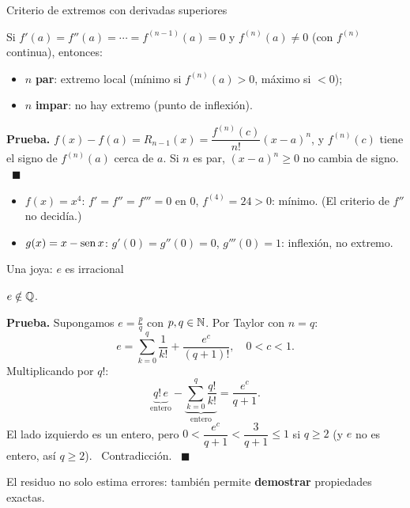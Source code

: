 \documentclass[10pt,aspectratio=169]{beamer}
\begin{document}
\begin{frame}{Criterio de extremos con derivadas superiores}
  \begin{teorema}
    Si $f'(a)=f''(a)=\cdots=f^{(n-1)}(a)=0$ y $f^{(n)}(a)\neq0$ (con $f^{(n)}$ continua), entonces:
    \begin{itemize}
      \item $n$ \textbf{par}: extremo local (mínimo si $f^{(n)}(a)>0$, máximo si $<0$);
      \item $n$ \textbf{impar}: no hay extremo (punto de inflexión).
    \end{itemize}
  \end{teorema}
  \textbf{Prueba.} $f(x)-f(a)=R_{n-1}(x)=\dfrac{f^{(n)}(c)}{n!}(x-a)^n$, y $f^{(n)}(c)$ tiene el signo de $f^{(n)}(a)$ cerca de $a$. Si $n$ es par,
  $(x-a)^n\ge0$ no cambia de signo. \ $\blacksquare$
  \begin{ejemplo}[6]
    \begin{itemize}
      \item $f(x)=x^4$: $f'=f''=f'''=0$ en $0$, $f^{(4)}=24>0$: mínimo. (El criterio de $f''$ no decidía.)
      \item $g(x)=x-\operatorname{sen} x$: $g'(0)=g''(0)=0$, $g'''(0)=1$: inflexión, no extremo.
    \end{itemize}
  \end{ejemplo}
\end{frame}

\begin{frame}{Una joya: $e$ es irracional}
  \begin{teorema}
    $e\notin\mathbb{Q}$.
  \end{teorema}
  \textbf{Prueba.} Supongamos $e=\frac pq$ con $p,q\in\mathbb{N}$. Por Taylor con $n=q$:
  \[ e=\sum_{k=0}^q\frac1{k!}+\frac{e^c}{(q+1)!},\quad0<c<1. \]
  Multiplicando por $q!$:
  \[ \underbrace{q!\,e}_{\text{entero}}-\underbrace{\sum_{k=0}^q\frac{q!}{k!}}_{\text{entero}}=\frac{e^c}{q+1}. \]
  El lado izquierdo es un entero, pero $0<\dfrac{e^c}{q+1}<\dfrac{3}{q+1}\le1$ si $q\ge2$ (y $e$ no es entero, así $q\ge2$). \
  Contradicción. \ $\blacksquare$
  \begin{idea}
    El residuo no solo estima errores: también permite \textbf{demostrar} propiedades exactas.
  \end{idea}
\end{frame}
\end{document}
